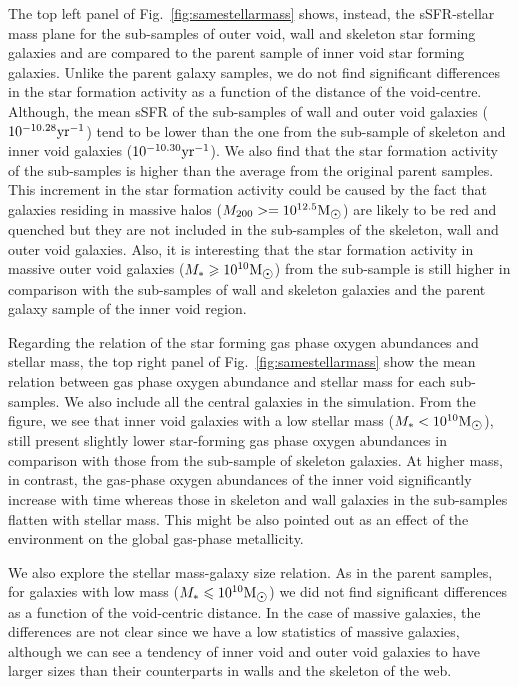 \documentclass[a4paper,fleqn,usenatbib,letter]{mnras}
\newcommand{\Msun}{\rm M_{\sun}}
\begin{document}
The top left panel of Fig.~\ref{fig:samestellarmass} shows, instead, the sSFR-stellar mass plane for the sub-samples of outer void, wall and skeleton star forming  galaxies and are compared to the parent sample of inner void star forming  galaxies. Unlike the parent galaxy samples, we do not find significant differences in the star formation activity as a function of the distance of the void-centre. Although, the mean sSFR  of the sub-samples of wall and outer void galaxies ($10^{-10.28}\rm yr^{-1}$) tend to be lower than the one from the sub-sample of skeleton and inner void galaxies ($10^{-10.30}\rm yr^{-1}$). We also find that the star formation activity of the sub-samples is higher than the average from the original parent samples. This increment in the star formation activity  could be caused by the fact that galaxies residing in massive halos ($M_{200}>=10^{12.5}\Msun$) are likely to be red and quenched but they  are not included in the sub-samples of the skeleton, wall and outer void galaxies. Also, it is interesting that the star formation activity  in massive outer void galaxies ($M_{*}\geq10^{10}\Msun$) from the sub-sample is still higher in comparison with the sub-samples of  wall and skeleton galaxies and the parent galaxy sample of the inner void region. 

Regarding the relation of the star forming gas phase oxygen abundances  and stellar mass, the top right panel of Fig.~\ref{fig:samestellarmass} show the mean relation between gas phase oxygen abundance and stellar mass for each sub-samples. We also include  all the central galaxies in the simulation. From the figure, we see that inner void galaxies with a low stellar mass ($M_{*}<10^{10}\Msun$), still present slightly lower star-forming gas phase oxygen abundances in comparison with those from the sub-sample of skeleton galaxies. At higher mass, in contrast, the gas-phase oxygen abundances of the inner void significantly increase with time whereas those in skeleton and wall  galaxies in the sub-samples flatten with stellar mass. This might be also pointed out as an effect of the environment on the global gas-phase metallicity.     

We also explore the stellar mass-galaxy size relation. As in the parent samples, for galaxies with low mass ($M_{*}\leq 10^{10}\Msun$) we did not find  significant differences as a function of the void-centric distance. In the case  of massive galaxies, the differences are not clear since we have a low statistics of massive galaxies, although we can see a tendency of inner void and outer void galaxies to have larger sizes than their counterparts in walls and the skeleton of the web. 
\end{document}
